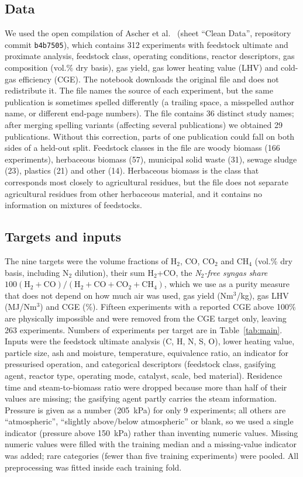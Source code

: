 \documentclass[11pt,a4paper]{article}
\begin{document}
\subsection{Data}
We used the open compilation of Ascher et al.\ \cite{Ascher2022} (sheet ``Clean Data'', repository commit \texttt{b4b7505}), which contains 312 experiments with feedstock ultimate and proximate analysis, feedstock class, operating conditions, reactor descriptors, gas composition (vol.\% dry basis), gas yield, gas lower heating value (LHV) and cold-gas efficiency (CGE). The notebook downloads the original file and does not redistribute it. The file names the source of each experiment, but the same publication is sometimes spelled differently (a trailing space, a misspelled author name, or different end-page numbers). The file contains 36 distinct study names; after merging spelling variants (affecting several publications) we obtained 29 publications. Without this correction, parts of one publication could fall on both sides of a held-out split. Feedstock classes in the file are woody biomass (166 experiments), herbaceous biomass (57), municipal solid waste (31), sewage sludge (23), plastics (21) and other (14). Herbaceous biomass is the class that corresponds most closely to agricultural residues, but the file does not separate agricultural residues from other herbaceous material, and it contains no information on mixtures of feedstocks.

\subsection{Targets and inputs}
The nine targets were the volume fractions of H$_2$, CO, CO$_2$ and CH$_4$ (vol.\% dry basis, including N$_2$ dilution), their sum H$_2$+CO, the \emph{N$_2$-free syngas share} $100(\mathrm{H_2}+\mathrm{CO})/(\mathrm{H_2}+\mathrm{CO}+\mathrm{CO_2}+\mathrm{CH_4})$, which we use as a purity measure that does not depend on how much air was used, gas yield (Nm$^3$/kg), gas LHV (MJ/Nm$^3$) and CGE (\%). Fifteen experiments with a reported CGE above 100\% are physically impossible and were removed from the CGE target only, leaving 263 experiments. Numbers of experiments per target are in Table~\ref{tab:main}.
Inputs were the feedstock ultimate analysis (C, H, N, S, O), lower heating value, particle size, ash and moisture, temperature, equivalence ratio, an indicator for pressurised operation, and categorical descriptors (feedstock class, gasifying agent, reactor type, operating mode, catalyst, scale, bed material). Residence time and steam-to-biomass ratio were dropped because more than half of their values are missing; the gasifying agent partly carries the steam information. Pressure is given as a number (205~kPa) for only 9 experiments; all others are ``atmospheric'', ``slightly above/below atmospheric'' or blank, so we used a single indicator (pressure above 150~kPa) rather than inventing numeric values. Missing numeric values were filled with the training median and a missing-value indicator was added; rare categories (fewer than five training experiments) were pooled. All preprocessing was fitted inside each training fold.
\end{document}
